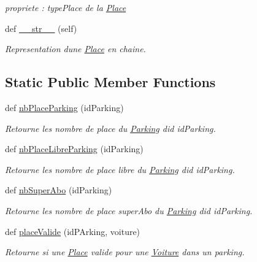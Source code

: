 \begin{DoxyCompactItemize}
\begin{DoxyCompactList}\small\item\em propriete \+: type\+Place de la \hyperlink{classsrc_1_1m_1_1_parking_1_1_place}{Place} \end{DoxyCompactList}\item 
\hypertarget{classsrc_1_1m_1_1_parking_1_1_place_a9d97601648fc705d92a40871cb14683b}{}def \hyperlink{classsrc_1_1m_1_1_parking_1_1_place_a9d97601648fc705d92a40871cb14683b}{\+\_\+\+\_\+str\+\_\+\+\_\+} (self)\label{classsrc_1_1m_1_1_parking_1_1_place_a9d97601648fc705d92a40871cb14683b}

\begin{DoxyCompactList}\small\item\em Representation d\textquotesingle{}une \hyperlink{classsrc_1_1m_1_1_parking_1_1_place}{Place} en chaine. \end{DoxyCompactList}\end{DoxyCompactItemize}
\subsection*{Static Public Member Functions}
\begin{DoxyCompactItemize}
\item 
def \hyperlink{classsrc_1_1m_1_1_parking_1_1_place_a16ba1f63ef28f371a1f40a6c81c7f181}{nb\+Place\+Parking} (id\+Parking)
\begin{DoxyCompactList}\small\item\em Retourne les nombre de place du \hyperlink{classsrc_1_1m_1_1_parking_1_1_parking}{Parking} d\textquotesingle{}id id\+Parking. \end{DoxyCompactList}\item 
def \hyperlink{classsrc_1_1m_1_1_parking_1_1_place_aefe103023264bb06f3ebff3f76285ed0}{nb\+Place\+Libre\+Parking} (id\+Parking)
\begin{DoxyCompactList}\small\item\em Retourne les nombre de place libre du \hyperlink{classsrc_1_1m_1_1_parking_1_1_parking}{Parking} d\textquotesingle{}id id\+Parking. \end{DoxyCompactList}\item 
def \hyperlink{classsrc_1_1m_1_1_parking_1_1_place_a87e2d30e4f87f53a0535793c07cf7ec8}{nb\+Super\+Abo} (id\+Parking)
\begin{DoxyCompactList}\small\item\em Retourne les nombre de place super\+Abo du \hyperlink{classsrc_1_1m_1_1_parking_1_1_parking}{Parking} d\textquotesingle{}id id\+Parking. \end{DoxyCompactList}\item 
def \hyperlink{classsrc_1_1m_1_1_parking_1_1_place_a0edd9c0707f91ebd5253d06cb086d4e3}{place\+Valide} (id\+P\+Arking, voiture)
\begin{DoxyCompactList}\small\item\em Retourne si une \hyperlink{classsrc_1_1m_1_1_parking_1_1_place}{Place} valide pour une \hyperlink{namespacesrc_1_1m_1_1_voiture}{Voiture} dans un parking. \end{DoxyCompactList}\end{DoxyCompactItemize}


